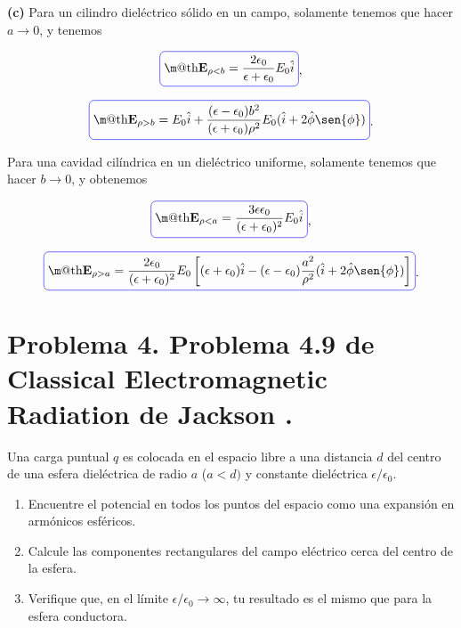 \documentclass[a4paper,11pt]{article}
\makeatletter
\numberwithin{equation}{section}
\newcommand*{\boxcolor}{blue}
\renewcommand{\boxed}[1]{\textcolor{\boxcolor}{%
\tikz[baseline={([yshift=-1ex]current bounding box.center)}] \node [rectangle, minimum width=1ex,rounded corners,draw] {\normalcolor\m@th$\displaystyle#1$};}}
\makeatother
\begin{document}
\textbf{(c)} Para un cilindro dieléctrico sólido en un campo, solamente tenemos que 
hacer $a \rightarrow 0$, y tenemos 

\begin{equation}
 \boxed{\mathbf{E}_{\rho < b} = \frac{2\epsilon_0}{\epsilon + \epsilon_0}E_0 \hat{i}},
\end{equation}

\begin{equation}
 \boxed{ \mathbf{E}_{\rho > b} = E_0\hat{i} + \frac{(\epsilon - \epsilon_0)b^2}
 {(\epsilon + \epsilon_0)\rho^2}E_0(\hat{i} + 2\hat{\phi}\sen{\phi})}.
\end{equation}

Para una cavidad cilíndrica en un dieléctrico uniforme, solamente tenemos que 
hacer $b \rightarrow 0$, y obtenemos 

\begin{equation}
 \boxed{\mathbf{E}_{\rho < a} = \frac{3\epsilon\epsilon_0}{(\epsilon + \epsilon_0)^2}
 E_0 \hat{i}},
\end{equation}

\begin{equation}
 \boxed{\mathbf{E}_{\rho > a} = \frac{2\epsilon_0}{(\epsilon + \epsilon_0)^2}E_0 
 \left[(\epsilon + \epsilon_0)\hat{i} - (\epsilon - \epsilon_0)\frac{a^2}{\rho^2}
 (\hat{i} + 2\hat{\phi}\sen{\phi})\right]}.
\end{equation}

\newpage

\section{Problema 4. Problema 4.9 de Classical Electromagnetic Radiation
de Jackson \cite{jackson}.}

Una carga puntual $q$ es colocada en el espacio libre a una distancia $d$ del centro 
de una esfera dieléctrica de radio $a$ ($a < d)$ y constante dieléctrica 
$\epsilon/\epsilon_0$. 

\begin{enumerate}[label=\textbf{(\alph*)}]
\item Encuentre el potencial en todos los puntos del espacio como una expansión 
en armónicos esféricos.
\item Calcule las componentes rectangulares del campo eléctrico cerca del 
centro de la esfera.
\item Verifique que, en el límite $\epsilon/\epsilon_0 \rightarrow \infty$, tu 
resultado es el mismo que para la esfera conductora.
\end{enumerate}
\end{document}
